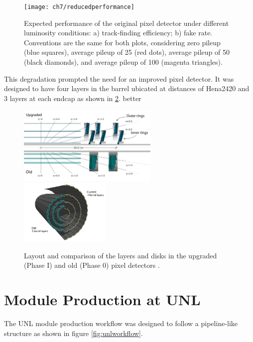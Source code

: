 \begin{figure}[!h]
\centering
\texttt{[image: ch7/reducedperformance]}
\caption[Expected performance of the original pixel detector for different luminosities.]{Expected performance of the original pixel detector under different luminosity conditions: a) track-finding efficiency; b) fake rate. Conventions are the same for both plots, considering zero pileup (blue squares), average pileup of 25 (red dots), average pileup of 50 (black diamonds), and average pileup of 100 (magenta triangles).\cite{pix_tdr}}\label{fig:red_perf}
\end{figure}

This degradation prompted the need for an improved pixel detector. It was designed to have four layers in the barrel ubicated at distances of Hena2420
and 3 layers at each endcap as shown in \ref{fig:new_pix}. better

\begin{figure}[!h]
\centering
\includegraphics[width=0.6\textwidth]{../images/ch7/fpix.pdf}
\includegraphics[width=0.39\textwidth]{../images/ch7/bpix.pdf}
\caption[Layout of the upgraded and old pixel detectors.]{Layout and comparison of the layers and disks in the upgraded (Phase I) and old (Phase 0) pixel detectors \cite{pix_tdr}.}\label{fig:new_pix}
\end{figure}


\section{Module Production at UNL}
The UNL module production workflow was designed to follow a pipeline-like structure as shown in figure \ref{fig:unlworkflow}. 

